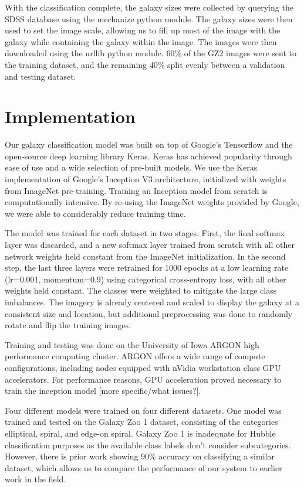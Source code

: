 \documentclass{article}
\begin{document}
With the classification complete, the galaxy sizes were collected by querying the SDSS database using the mechanize python module. The galaxy sizes were then used to set the image scale, allowing us to fill up most of the image with the galaxy while containing the galaxy within the image. The images were then downloaded using the urllib python module. 60\% of the GZ2 images were sent to the training dataset, and the remaining 40\% split evenly between a validation and testing dataset.


\section{Implementation}
Our galaxy classification model was built on top of Google’s Tensorflow and the open-source deep learning library Keras. Keras has achieved popularity through ease of use and a wide selection of pre-built models. We use the Keras implementation of Google’s Inception V3 architecture, initialized with weights from ImageNet pre-training. Training an Inception model from scratch is computationally intensive. By re-using the ImageNet weights provided by Google, we were able to considerably reduce training time. 

The model was trained for each dataset in two stages. First, the final softmax layer was discarded, and a new softmax layer trained from scratch with all other network weights held constant from the ImageNet initialization. In the second step, the last three layers were retrained for 1000 epochs at a low learning rate (lr=0.001, momentum=0.9) using categorical cross-entropy loss, with all other weights held constant. The classes were weighted to mitigate the large class imbalances. The imagery is already centered and scaled to display the galaxy at a consistent size and location, but additional preprocessing was done to randomly rotate and flip the training images.

Training and testing was done on the University of Iowa ARGON high performance computing cluster. ARGON offers a wide range of compute configurations, including nodes equipped with nVidia workstation class GPU accelerators. For performance reasons, GPU acceleration proved necessary to train the inception model [more specific/what issues?]. 

Four different models were trained on four different datasets.  One model was trained and tested on the Galaxy Zoo 1 dataset, consisting of the categories elliptical, spiral, and edge-on spiral. Galaxy Zoo 1 is inadequate for Hubble classification purposes as the available class labels don't consider subcategories.  However, there is prior work \cite{2004MNRAS.349...87D} showing 90\% accuracy on classifying a similar dataset, which allows us to compare the performance of our system to earlier work in the field.
\end{document}
